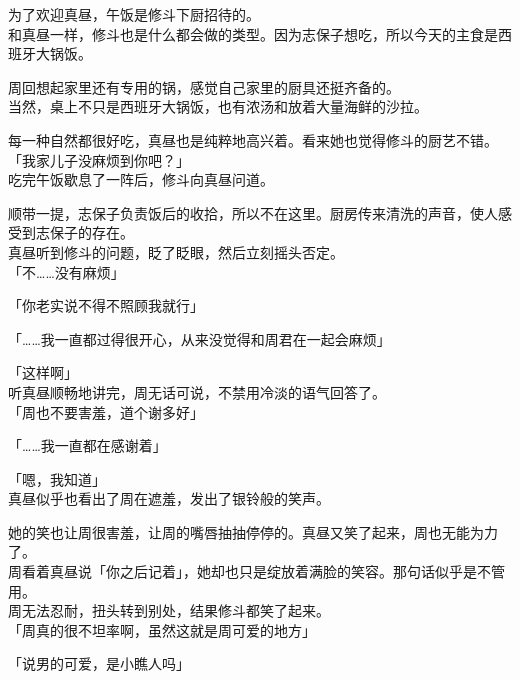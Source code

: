 \vspace{2\baselineskip}

为了欢迎真昼，午饭是修斗下厨招待的。\\

和真昼一样，修斗也是什么都会做的类型。因为志保子想吃，所以今天的主食是西班牙大锅饭。

周回想起家里还有专用的锅，感觉自己家里的厨具还挺齐备的。\\

当然，桌上不只是西班牙大锅饭，也有浓汤和放着大量海鲜的沙拉。

每一种自然都很好吃，真昼也是纯粹地高兴着。看来她也觉得修斗的厨艺不错。\\

「我家儿子没麻烦到你吧？」\\

吃完午饭歇息了一阵后，修斗向真昼问道。

顺带一提，志保子负责饭后的收拾，所以不在这里。厨房传来清洗的声音，使人感受到志保子的存在。\\

真昼听到修斗的问题，眨了眨眼，然后立刻摇头否定。\\

「不……没有麻烦」

「你老实说不得不照顾我就行」

「……我一直都过得很开心，从来没觉得和周君在一起会麻烦」

「这样啊」\\

听真昼顺畅地讲完，周无话可说，不禁用冷淡的语气回答了。\\

「周也不要害羞，道个谢多好」

「……我一直都在感谢着」

「嗯，我知道」\\

真昼似乎也看出了周在遮羞，发出了银铃般的笑声。

她的笑也让周很害羞，让周的嘴唇抽抽停停的。真昼又笑了起来，周也无能为力了。\\

周看着真昼说「你之后记着」，她却也只是绽放着满脸的笑容。那句话似乎是不管用。\\

周无法忍耐，扭头转到别处，结果修斗都笑了起来。\\

「周真的很不坦率啊，虽然这就是周可爱的地方」

「说男的可爱，是小瞧人吗」

